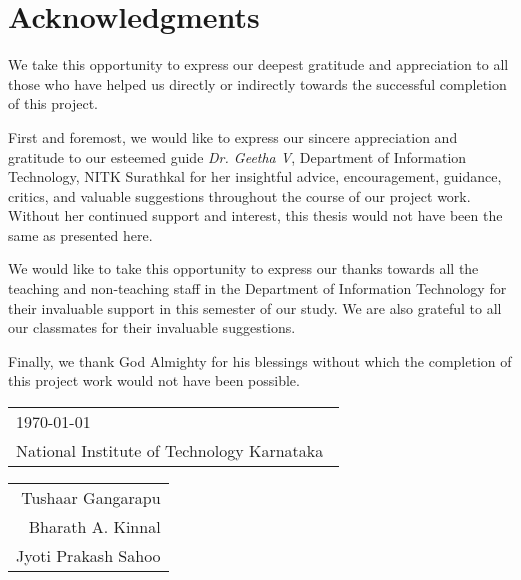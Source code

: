 \cleardoublepage
{}
{}
\chapter*{Acknowledgments}
We take this opportunity to express our deepest gratitude and appreciation to all those who have helped us directly or indirectly towards the successful completion of this project. \par
First and foremost, we would like to express our sincere appreciation and gratitude to our esteemed guide \textit{Dr. Geetha V}, Department of Information Technology, NITK Surathkal for her insightful advice, encouragement, guidance, critics, and valuable suggestions throughout the course of our project work. Without her continued support and interest, this thesis would not have been the same as presented here.\par
We would like to take this opportunity to express our thanks towards all the teaching and non-teaching staff in the Department of Information Technology for their invaluable support in this semester of our study. We are also grateful to all our classmates for their  invaluable suggestions. \par
Finally, we thank God Almighty for his blessings without which the completion of this project work would not have been possible.

\vfill

\noindent
\begin{tabular}[t]{@{}l} 
\\
\today \\
{National Institute of Technology Karnataka}\
\end{tabular}
\hfill%
\begin{tabular}[t]{r@{}}
Tushaar Gangarapu \\
Bharath A. Kinnal \\
Jyoti Prakash Sahoo
\end{tabular}